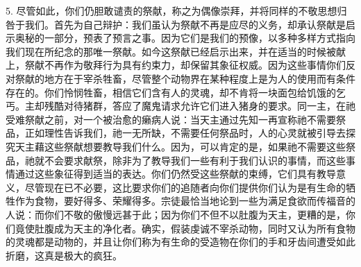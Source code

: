 5. 尽管如此，你们仍胆敢谴责的祭献，称之为偶像崇拜，并将同样的不敬思想归咎于我们。首先为自己辩护：我们虽认为祭献不再是应尽的义务，却承认祭献是启示奥秘的一部分，预表了预言之事。因为它们是我们的预像，以多种多样方式指向我们现在所纪念的那唯一祭献。如今这祭献已经启示出来，并在适当的时候被献上，祭献不再作为敬拜行为具有约束力，却保留其象征权威。因为这些事情你们反对祭献的地方在于宰杀牲畜，尽管整个动物界在某种程度上是为人的使用而有条件存在的。你们怜悯牲畜，相信它们含有人的灵魂，却不肯将一块面包给饥饿的乞丐。主却残酷对待猪群，答应了魔鬼请求允许它们进入猪身的要求。同一主，在祂受难祭献之前，对一个被治愈的癞病人说：当天主通过先知一再宣称祂不需要祭品，正如理性告诉我们，祂一无所缺，不需要任何祭品时，人的心灵就被引导去探究天主藉这些祭献想要教导我们什么。因为，可以肯定的是，如果祂不需要这些祭品，祂就不会要求献祭，除非为了教导我们一些有利于我们认识的事情，而这些事情通过这些象征得到适当的表达。你们仍然受这些祭献的束缚，它们具有教导意义，尽管现在已不必要，这比要求你们的追随者向你们提供你们认为是有生命的牺牲作为食物，要好得多、荣耀得多。宗徒最恰当地论到一些为满足食欲而传福音的人说：而你们不敬的傲慢远甚于此；因为你们不但不以肚腹为天主，更糟的是，你们竟使肚腹成为天主的净化者。确实，假装虔诚不宰杀动物，同时又认为所有食物的灵魂都是动物的，并且让你们称为有生命的受造物在你们的手和牙齿间遭受如此折磨，这真是极大的疯狂。\par

